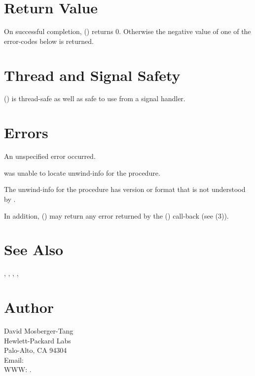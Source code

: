 \documentclass{article}
\begin{document}
\section{Return Value}

On successful completion, ()
returns 0.  Otherwise the negative value of one of the error-codes
below is returned.

\section{Thread and Signal Safety}

() is thread-safe as well as safe to use
from a signal handler.

\section{Errors}

\begin{Description}
\item[\Const{UNW\_EUNSPEC}] An unspecified error occurred.
\item[\Const{UNW\_ENOINFO}]  was unable to locate
  unwind-info for the procedure.
\item[\Const{UNW\_EBADVERSION}] The unwind-info for the procedure has
  version or format that is not understood by .
\end{Description}
In addition, () may return any error
returned by the () call-back (see
(3)).

\section{See Also}

,
,
,
,

\section{Author}

\noindent
David Mosberger-Tang\\
Hewlett-Packard Labs\\
Palo-Alto, CA 94304\\
Email: \\
WWW: .
\LatexManEnd
\end{document}
